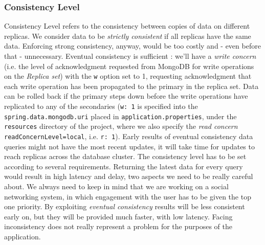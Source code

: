 \subsubsection{Consistency Level}
Consistency Level refers to the consistency between copies of data on different replicas. We consider data to be \emph{strictly consistent} if all replicas have the same data. Enforcing strong consistency, anyway, would be too costly and - even before that - unnecessary. Eventual consistency is sufficient : we'll have a \emph{write concern} (i.e. the level of acknowledgment requested from MongoDB for write operations on the \emph{Replica set}) with the \texttt{w} option set to 1, requesting acknowledgment that each write operation has been propagated to the primary in the replica set. Data can be rolled back if the primary steps down before the write operations have replicated to any of the secondaries (\texttt{w: 1} is specified into the \texttt{spring.data.mongodb.uri} placed in \texttt{application.properties}, under the \texttt{resources} directory of the project, where we also specify the \emph{read concern} \texttt{readConcernLevel=local}, i.e. \texttt{r: 1}). Early results of eventual consistency data queries might not have the most recent updates, it will take time for updates to reach replicas across the database cluster.
The consistency level has to be set according to several requirements. 
Returning the latest data for every query would result in high latency and delay, two aspects we need to be really careful about. We always need to keep in mind that we are working on a social networking system, in which engagement with the user has to be given the top one priority. By exploiting \emph{eventual consistency} results will be less consistent early on, but they will be provided much faster, with low latency. Facing inconsistency does not really represent a problem for the purposes of the application.


